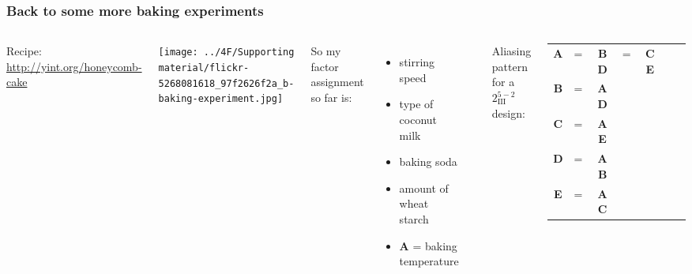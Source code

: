 \begin{frame}\frametitle{Back to some more baking experiments}
	\begin{columns}[T]
		
			\vspace{1cm}
			{\small Recipe: \href{http://yint.org/honeycomb-cake}{http://yint.org/honeycomb-cake}}
		
			\vspace{1cm}
		
			\centerline{\texttt{[image: ../4F/Supporting material/flickr-5268081618\_97f2626f2a\_b-baking-experiment.jpg]}}
			
		
			{\color{myOrange}So my factor assignment so far is:}
			\begin{itemize}
				\item	stirring speed
				\item	type of coconut milk
				\item	baking soda
				\item	amount of wheat starch
				\item	\textbf{A} = baking temperature
			\end{itemize}
			
			\vspace{0.4cm}
			\hrule
			
			\vspace{0.1cm}
			Aliasing pattern for a $2^{5-2}_{\textrm{III}}$ design:
			\begin{tabulary}{\linewidth}{ccccccc}				
				\textbf{A} & = & \textbf{BD} & = & \textbf{CE}  \\
				\textbf{B} & = & \textbf{AD} & & \\
				\textbf{C} & = & \textbf{AE} & & \\
				\textbf{D} & = & \textbf{AB} & & \\
				\textbf{E} & = & \textbf{AC} & & 
			\end{tabulary}
			
	\end{columns}
	
	\vspace{1cm}

	
\end{frame}

